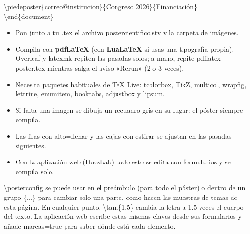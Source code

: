 \documentclass{article}
\newcommand{\bs}{\textbackslash}
\newcommand{\cod}[1]{{\ttfamily\tam{0.8}#1}}  %
\begin{document}
\begin{fila}[columnas=5]
\begin{columna}[abarca=3]
\begin{caja}[titulo={Ejemplo mínimo de un póster}, estilo=borde]
\begin{codigoej}
        \bs piedeposter\{correo@institucion\}\{Congreso 2026\}\{Financiación\}\\
        \bs end\{document\}
      \end{codigoej}
    \end{caja}
  \end{columna}
  \begin{columna}[abarca=2]
    \begin{caja}[titulo={Cómo compilar}, estilo=borde]
      \begin{itemize}[leftmargin=1.1em, itemsep=0.3em]
        \item Pon junto a tu \cod{.tex} el archivo \cod{postercientifico.sty} y la carpeta de imágenes.
        \item Compila con \textbf{pdfLaTeX} (con \textbf{LuaLaTeX} si usas una tipografía propia). Overleaf y
          latexmk repiten las pasadas solos; a mano, repite \cod{pdflatex poster.tex} mientras salga el aviso «Rerun»
          (2 o 3 veces).
        \item Necesita paquetes habituales de TeX Live: tcolorbox, TikZ, multicol, wrapfig, lettrine, enumitem,
          booktabs, adjustbox y lipsum.
        \item Si falta una imagen se dibuja un recuadro gris en su lugar: el póster siempre compila.
        \item Las filas con \cod{alto=llenar} y las cajas con \cod{estirar} se ajustan en las pasadas siguientes.
        \item Con la aplicación web (DocsLab) todo esto se edita con formularios y se compila solo.
      \end{itemize}
    \end{caja}
  \end{columna}
\end{fila}

\begin{caja}[estilo=nota, titulo={Todo se puede cambiar en cualquier momento}]
  \cod{\bs posterconfig} se puede usar en el preámbulo (para todo el póster) o dentro de un grupo
  \cod{\{...\}} para cambiar solo una parte, como hacen las muestras de temas de esta página. En cualquier punto,
  \cod{\bs tam\{1.5\}} cambia la letra a 1.5 veces el cuerpo del texto. La aplicación web escribe estas mismas
  claves desde sus formularios y añade \cod{marcas=true} para saber dónde está cada elemento.
\end{caja}
\end{document}
